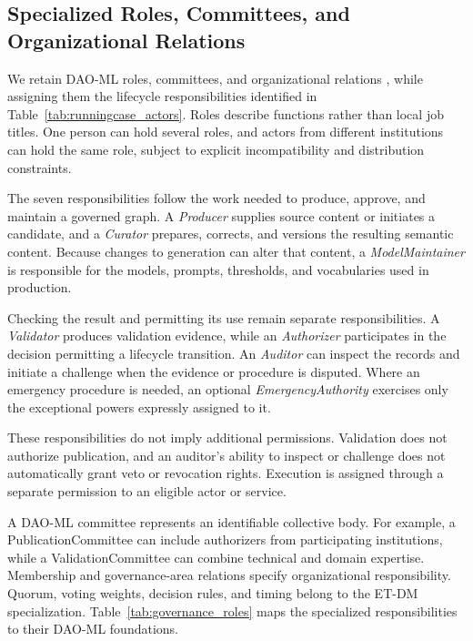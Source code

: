 \documentclass[journal]{IEEEtran}
\begin{document}
\subsection{Specialized Roles, Committees, and Organizational Relations}
\label{sec:roles}

We retain DAO-ML roles, committees, and organizational relations
\cite{Avanzo2024DAOML}, while assigning them the lifecycle
responsibilities identified in Table~\ref{tab:runningcase_actors}. Roles describe functions rather than
local job titles. One person can hold several roles, and actors
from different institutions can hold the same role, subject
to explicit incompatibility and distribution constraints.

The seven responsibilities follow the work needed to produce, approve,
and maintain a governed graph. A \emph{Producer} supplies source content
or initiates a candidate, and a \emph{Curator} prepares, corrects, and
versions the resulting semantic content. Because changes to generation
can alter that content, a \emph{ModelMaintainer} is responsible for the
models, prompts, thresholds, and vocabularies used in production.

Checking the result and permitting its use remain separate responsibilities.
A \emph{Validator} produces validation evidence, while an
\emph{Authorizer} participates in the decision permitting a lifecycle
transition. An \emph{Auditor} can inspect the records and initiate a
challenge when the evidence or procedure is disputed. Where an emergency
procedure is needed, an optional \emph{EmergencyAuthority} exercises
only the exceptional powers expressly assigned to it.

These responsibilities do not imply additional permissions.
Validation does not authorize publication, and an auditor's
ability to inspect or challenge does not automatically grant
veto or revocation rights. Execution is assigned through
a separate permission to an eligible actor or service.

A DAO-ML committee represents an identifiable collective body.
For example, a PublicationCommittee can include authorizers
from participating institutions, while a ValidationCommittee
can combine technical and domain expertise. Membership and
governance-area relations specify organizational responsibility.
Quorum, voting weights, decision rules, and timing belong
to the ET-DM specialization. Table~\ref{tab:governance_roles} maps the specialized
responsibilities to their DAO-ML foundations.
\end{document}
